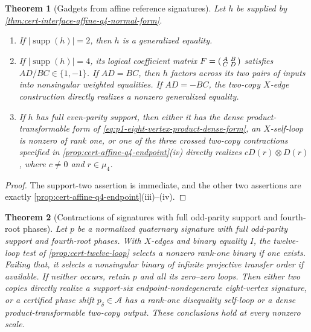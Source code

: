 \documentclass[11pt,letterpaper,onecolumn]{article}
\theoremstyle{plain}
\newtheorem{theorem}{Theorem}[section]
\theoremstyle{definition}
\theoremstyle{remark}
\newcommand{\cA}{\mathscr A}
\newcommand{\supp}{\operatorname{supp}}
\begin{document}
\begin{theorem}[Gadgets from affine reference signatures]
\label{thm:cert-interface-affine-q4-gadget-exits}
Let \(h\) be supplied by
\cref{thm:cert-interface-affine-q4-normal-form}.
\begin{enumerate}[label=\textnormal{(\roman*)}]
\item If \(|\supp(h)|=2\), then \(h\) is a generalized equality.
\item If \(|\supp(h)|=4\), its logical coefficient matrix
      \(F=\begin{psmallmatrix}A&B\\ C&D\end{psmallmatrix}\) satisfies
      \(AD/BC\in\{1,-1\}\).  If \(AD=BC\), then \(h\) factors
      across its two pairs of inputs into nonsingular weighted equalities.
      If \(AD=-BC\), the two-copy \(X\)-edge construction directly
      realizes a nonzero generalized equality.
\item If \(h\) has full even-parity support, then either it has the dense
      product-transformable form of
      \cref{eq:p1-eight-vertex-product-dense-form}, an \(X\)-self-loop
      is nonzero of rank one, or one of the three crossed two-copy
      contractions specified in
      \cref{prop:cert-affine-q4-endpoint}\textnormal{(iv)} directly realizes
      \(cD(r)\otimes D(r)\), where \(c\ne0\) and \(r\in\mu_4\).
\end{enumerate}
\end{theorem}

\begin{proof}
The support-two assertion is immediate, and the other two assertions are
exactly \cref{prop:cert-affine-q4-endpoint}\textnormal{(iii)--(iv)}.
\end{proof}

\begin{theorem}[Contractions of signatures with full odd-parity support and fourth-root phases]
\label{thm:cert-interface-affine-q4-odd}
Let \(p\) be a normalized quaternary signature with full odd-parity support
and fourth-root phases. With \(X\)-edges and binary equality \(I\), the
twelve-loop test of \cref{prop:cert-twelve-loop} selects a nonzero rank-one binary if one
exists. Failing that, it selects a nonsingular binary of infinite projective
transfer order if available. If neither occurs, retain \(p\) and all its
zero--zero loops. Then either two copies directly realize a support-six
endpoint-nondegenerate eight-vertex signature, or a certified phase shift
\(p_\delta\in\cA\) has a rank-one disequality self-loop or a dense
product-transformable two-copy output. These conclusions hold at every nonzero scale.
\end{theorem}
\end{document}
